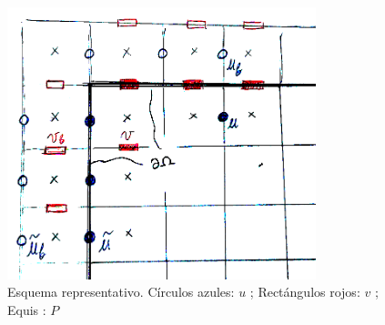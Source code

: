 \begin{figure} [H]
\centering
\includegraphics[width=0.8\textwidth]{malla.png}
\caption{Esquema representativo. Círculos azules: $u$ ; Rectángulos rojos: $v$ ; Equis : $P$} \label{fig1}
\end{figure}